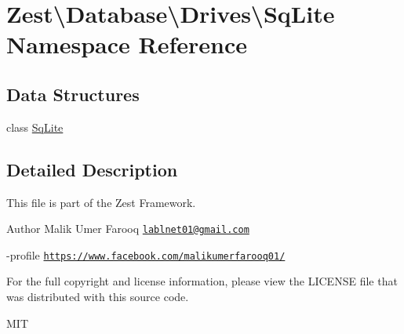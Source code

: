 \hypertarget{namespace_zest_1_1_database_1_1_drives_1_1_sq_lite}{}\section{Zest\textbackslash{}Database\textbackslash{}Drives\textbackslash{}Sq\+Lite Namespace Reference}
\label{namespace_zest_1_1_database_1_1_drives_1_1_sq_lite}
\subsection*{Data Structures}
\begin{DoxyCompactItemize}
\item 
class \mbox{\hyperlink{class_zest_1_1_database_1_1_drives_1_1_sq_lite_1_1_sq_lite}{Sq\+Lite}}
\end{DoxyCompactItemize}


\subsection{Detailed Description}
This file is part of the Zest Framework.

\begin{DoxyAuthor}{Author}
Malik Umer Farooq \href{mailto:lablnet01@gmail.com}{\tt lablnet01@gmail.\+com} 

-\/profile \href{https://www.facebook.com/malikumerfarooq01/}{\tt https\+://www.\+facebook.\+com/malikumerfarooq01/}
\end{DoxyAuthor}
For the full copyright and license information, please view the L\+I\+C\+E\+N\+SE file that was distributed with this source code.

M\+IT 